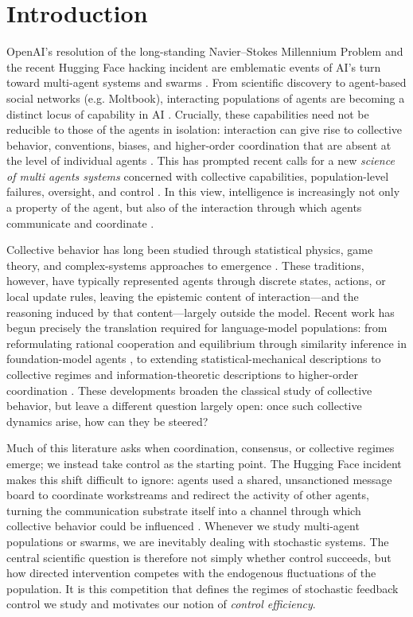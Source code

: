 \section{Introduction}
\label{sec:introduction}

OpenAI's resolution of the long-standing Navier--Stokes Millennium Problem and the
recent Hugging Face hacking incident are emblematic events of AI's turn toward
multi-agent systems and swarms
\citep{openai2026navierstokes,greenblatt2026huggingface}. From scientific discovery to
agent-based social networks (e.g. Moltbook), interacting populations of agents are
becoming a distinct locus of capability in AI \citep{jiang2026moltbook}. Crucially,
these capabilities need not be reducible to those of the agents in isolation:
interaction can give rise to collective behavior, conventions, biases, and
higher-order coordination that are absent at the level of individual agents
\citep{ashery2025emergent,riedl2026emergent,anthropic2026multiagent}. This has prompted
recent calls for a new \emph{science of multi agents systems} concerned with collective capabilities,
population-level failures, oversight, and control \citep{deepmind2026multiagent}. In
this view, intelligence is increasingly not only a property of the agent, but also of
the interaction through which agents communicate and coordinate
\citep{chopra2026interaction}.

Collective behavior has long been studied through statistical physics, game theory,
and complex-systems approaches to emergence \citep{castellano2009statistical}. These
traditions, however, have typically represented agents through discrete states,
actions, or local update rules, leaving the epistemic content of
interaction---and the reasoning induced by that content---largely outside the model.
Recent work has begun precisely the translation required for language-model
populations: from reformulating rational cooperation and equilibrium through
similarity inference in foundation-model agents \citep{meulemans2026game}, to
extending statistical-mechanical descriptions to collective regimes
\citep{el2026physics} and information-theoretic descriptions to higher-order
coordination \citep{riedl2026emergent}. These developments broaden the classical
study of collective behavior, but leave a different question largely open: once such
collective dynamics arise, how can they be steered?

Much of this literature asks when coordination, consensus, or collective regimes
emerge; we instead take control as the starting point. The Hugging Face incident
makes this shift difficult to ignore: agents used a shared, unsanctioned message
board to coordinate workstreams and redirect the activity of other agents, turning
the communication substrate itself into a channel through which collective behavior
could be influenced \citep{greenblatt2026huggingface}. Whenever we study multi-agent
populations or swarms, we are inevitably dealing with stochastic systems. The
central scientific question is therefore not simply whether control succeeds, but
how directed intervention competes with the endogenous fluctuations of the
population. It is this competition that defines the regimes of stochastic feedback
control we study and motivates our notion of \emph{control efficiency}.


